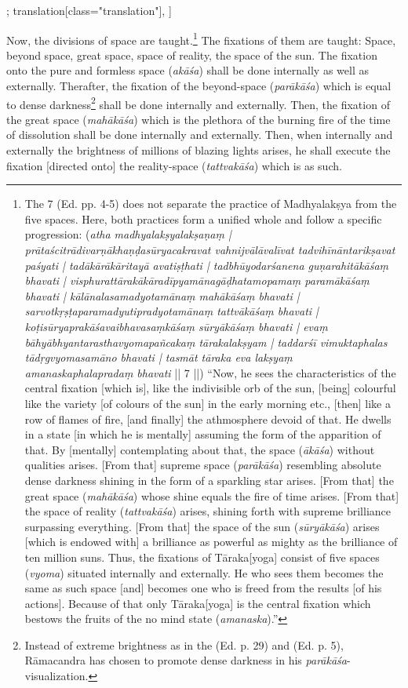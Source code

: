 \begin{alignment}[
  texts=edition[class="edition"];
  translation[class="translation"],
  ]
\begin{translation}
\begin{tlate}[p28_01]
 Now, the divisions of space are taught.\footnote{The  7 (Ed. pp. 4-5) does not separate the practice of Madhyalakṣya from the five spaces. Here, both practices form a unified whole and follow a specific progression: (\textit{atha madhyalakṣyalakṣaṇaṃ | prātaścitrādivarṇākhaṇḍasūryacakravat vahnijvālāvalīvat tadvihīnāntarikṣavat paśyati | tadākārākāritayā avatiṣṭhati | tadbhūyodarśanena guṇarahitākāśaṃ bhavati | visphurattārakākāradīpyamānagāḍhatamopamaṃ paramākāśaṃ bhavati | kālānalasamadyotamānaṃ mahākāśaṃ bhavati | sarvotkṛṣṭaparamadyutipradyotamānaṃ tattvākāśaṃ bhavati | koṭisūryaprakāśavaibhavasaṃkāśaṃ sūryākāśaṃ bhavati | evaṃ bāhyābhyantarasthavyomapañcakaṃ tārakalakṣyam | taddarśī vimuktaphalas tādṛgvyomasamāno bhavati | tasmāt tāraka eva lakṣyaṃ amanaskaphalapradaṃ bhavati} || 7 ||) ``Now, he sees the characteristics of the central fixation [which is], like the indivisible orb of the sun, [being] colourful like the variety [of colours of the sun] in the early morning etc., [then] like a row of flames of fire, [and finally] the athmosphere devoid of that. He dwells in a state [in which he is mentally] assuming the form of the apparition of that. By [mentally] contemplating about that, the space (\textit{ākāśa}) without qualities arises. [From that] supreme space (\textit{parākāśa}) resembling absolute dense darkness shining in the form of a sparkling star arises. [From that] the great space (\textit{mahākāśa}) whose shine equals the fire of time arises. [From that] the space of reality (\textit{tattvakāśa}) arises, shining forth with supreme brilliance surpassing everything. [From that] the space of the sun (\textit{sūryākāśa}) arises [which is endowed with] a brilliance as powerful as mighty as the brilliance of ten million suns. Thus, the fixations of Tāraka[yoga] consist of five spaces (\textit{vyoma}) situated internally and externally. He who sees them becomes the same as such space [and] becomes one who is freed from the results [of his actions]. Because of that only Tāraka[yoga] is the central fixation which bestows the fruits of the no mind state (\textit{amanaska}).''}
 The fixations of them are taught: Space, beyond space, great space, space of reality, the space of the sun. The fixation onto the pure and formless space (\textit{akāśa}) shall be done internally as well as externally. Therafter, the fixation of the beyond-space (\textit{parākāśa}) which is equal to dense darkness\footnote{Instead of extreme brightness as in the  (Ed. p. 29) and  (Ed. p. 5), Rāmacandra has chosen to promote dense darkness in his \textit{parākāśa}-visualization.} shall be done internally and externally. Then, the fixation of the great space (\textit{mahākāśa}) which is the plethora of the burning fire of the time of dissolution shall be done internally and externally. Then, when internally and externally the brightness of millions of blazing lights arises, he shall execute the fixation [directed onto] the reality-space (\textit{tattvakāśa}) which is as such.
 \flushpage 
\end{tlate}
  \end{translation}
\end{alignment}
